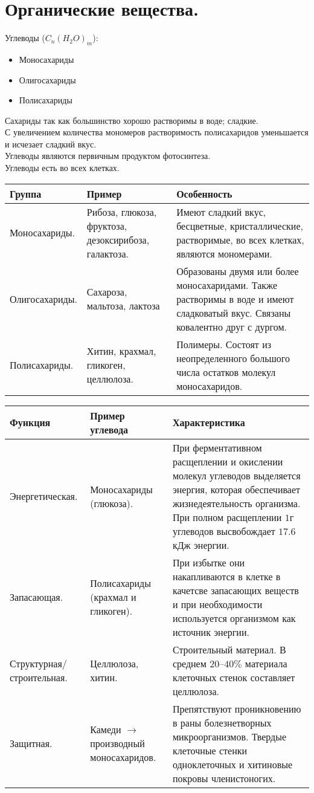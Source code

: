 \documentclass[12pt]{article}
\begin{document}
	\section{Органические вещества.}
	Углеводы ($C_n(H_2O)_m$):
	\begin{itemize}
		\item Моносахариды
		\item Олигосахариды
		\item Полисахариды
	\end{itemize}
	Сахариды так как большинство хорошо растворимы в воде; сладкие. \\
	С увеличением количества мономеров растворимость полисахаридов уменьшается и исчезает сладкий вкус. \\
	Углеводы являются первичным продуктом фотосинтеза. \\
	Углеводы есть во всех клетках.
	\begin{xltabular}{\textwidth}{|X|X|X|}
		\hline
		Группа & Пример & Особенность \\
		\hline
		Моносахариды. & Рибоза, глюкоза, фруктоза, дезоксирибоза, галактоза. & Имеют сладкий вкус, бесцветные, кристаллические, растворимые, во всех клетках, являются мономерами. \\
		\hline
		Олигосахариды. & Сахароза, мальтоза, лактоза & Образованы двумя или более моносахаридами. Также растворимы в воде и имеют сладковатый вкус. Связаны ковалентно друг с дургом. \\
		\hline
		Полисахариды. & Хитин, крахмал, гликоген, целлюлоза. & Полимеры. Состоят из неопределенного большого числа остатков молекул моносахаридов. \\
		\hline
	\end{xltabular}
	\begin{xltabular}{\textwidth}{|X|X|X|}
		\hline
		Функция & Пример углевода & Характеристика \\
		\hline
		Энергетическая. & Моносахариды (глюкоза). & При ферментативном расщеплении и окислении молекул углеводов выделяется энергия, которая обеспечивает жизнедеятельность организма. При полном расщеплении $1$г углеводов высвобождает $17.6$кДж энергии. \\
		\hline
		Запасающая. & Полисахариды (крахмал и гликоген). & При избытке они накапливаются в клетке в качетсве запасающих веществ и при необходимости используется организмом как источник энергии. \\
		\hline
		Структурная/строительная. & Целлюлоза, хитин. & Строительный материал. В среднем $20$--$40\%$ материала клеточных стенок составляет целлюлоза. \\
		\hline
		Защитная. & Камеди $\rightarrow$ производный моносахаридов. & Препятствуют проникновению в раны болезнетворных микроорганизмов. Твердые клеточные стенки одноклеточных и хитиновые покровы членистоногих. \\
		\hline
	\end{xltabular}
\end{document}
